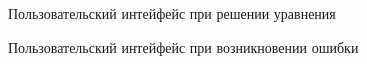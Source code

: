 \begin{figure}
    \centering
    \caption{Пользовательский интейфейс при решении уравнения}
    \label{fig:screenshot-solution}
\end{figure}

\begin{figure}
    \centering
    \caption{Пользовательский интейфейс при возникновении ошибки}
    \label{fig:screenshot-error}
\end{figure}

